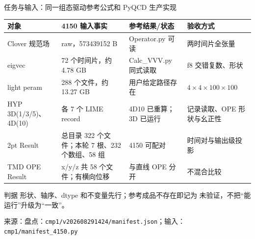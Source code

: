 \documentclass[UTF8,aspectratio=169,11pt]{ctexbeamer}
\newcommand{\source}[1]{\vspace{0.05em}\par{\raggedright\scriptsize\color{muted}来源：#1\par}}
\newcommand{\codepath}[1]{\nolinkurl{#1}}
\newcommand{\unverified}{\textcolor{warning}{未验证}}
\begin{document}
\begin{frame}[t]{任务与输入：同一组态驱动参考公式和 PyQCD 生产实现}
  \footnotesize
  \setlength{\tabcolsep}{3pt}
  \renewcommand{\arraystretch}{0.98}
  \begin{tabularx}{0.96\textwidth}{@{}L Y M Y@{}}
    \toprule
    对象 & 4150 输入事实 & 参考结果/状态 & 验收方式\\
    \midrule
    Clover 规范场 & raw，573439152 B & Operator.py 可读 & 两时间片全张量\\
    eigvec & 72 个时间片，约 4.78 GB & Calc\_VVV.py 同式读取 & f8 交错复数、形状\\
    light peram & 288 个文件，约 13.27 GB & 用户给定路径存在 & $4\times4\times100\times100$\\
    HYP 3D(1/3/5)、4D(10) & 各 7 个 LIME record & 4D10 已重算；3D 已运行 & 记录读取、OPE 形状与幺正性\\
    2pt Result & 总目录 322 个文件；本轮 7 根、232 个数组、58 组 & 4150 可配对 & 时间对与输出级投影\\
    TMD OPE Result & x/y/z 共 58 个文件；有横向位移 & 与直线 OPE 分开 & 不混合比较\\
    \bottomrule
  \end{tabularx}
  \vspace{0.12em}
  \begin{block}{判据}
    形状、轴序、dtype 和不变量先行；参考成品不存在即记为 \unverified，不把“能运行”升级为“一致”。
  \end{block}
  \source{盘点：\codepath{cmp1/v202608291424/manifest.json}；输入：\codepath{cmp1/manifest_4150.py}}
\end{frame}
\end{document}
